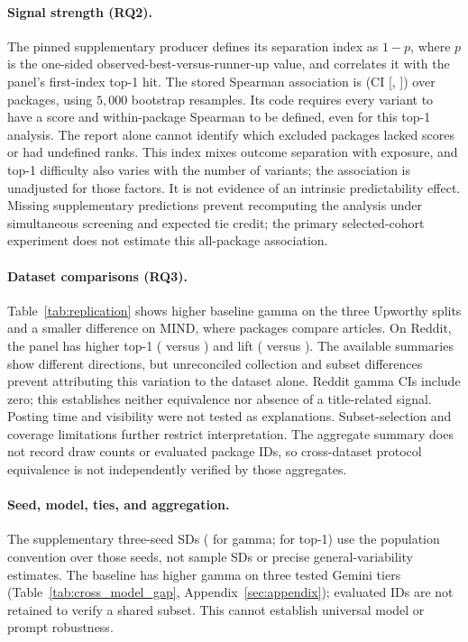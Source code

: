 \paragraph{Signal strength (RQ2).}
The pinned supplementary producer defines its separation index as $1-p$, where $p$ is the
one-sided observed-best-versus-runner-up value, and correlates it with the panel's first-index
top-1 hit. The stored Spearman association is \hThreeTopOne{} (CI
[\hThreeTopOneCILow{}, \hThreeTopOneCIHigh{}]) over \hThreeN{} packages, using $5{,}000$
bootstrap resamples. Its code requires every variant to have a score and within-package
Spearman to be defined, even for this top-1 analysis. The report alone cannot identify which
excluded packages lacked scores or had undefined ranks. This index mixes outcome separation
with exposure, and top-1 difficulty also varies with the number of variants; the association
is unadjusted for those factors. It is not evidence of an intrinsic predictability effect.
Missing supplementary predictions prevent recomputing the analysis under simultaneous screening
and expected tie credit; the primary selected-cohort experiment does not estimate this
all-package association.

\paragraph{Dataset comparisons (RQ3).}
Table~\ref{tab:replication} shows higher baseline gamma on the three Upworthy splits and a smaller
difference on MIND, where packages compare articles. On Reddit, the panel has higher top-1
(\redditPanelTop{} versus \redditBaseTop{}) and lift (\redditPanelLift{} versus \redditBaseLift{}).
The available summaries show different directions, but unreconciled collection and subset
differences prevent attributing this variation to the dataset alone. Reddit gamma
CIs include zero; this establishes neither equivalence nor absence of a title-related signal.
Posting time and visibility were not tested as explanations. Subset-selection and coverage
limitations further restrict interpretation. The aggregate summary does not record draw
counts or evaluated package IDs, so cross-dataset protocol equivalence is not independently
verified by those aggregates.


\paragraph{Seed, model, ties, and aggregation.}
The supplementary three-seed SDs (\stabGammaSD{} for gamma; \stabTopOneSD{} for top-1) use the
population convention over those seeds, not sample SDs or precise general-variability estimates.
The baseline has higher gamma on three tested Gemini tiers (Table~\ref{tab:cross_model_gap},
Appendix~\ref{sec:appendix}); evaluated IDs are not retained to verify a shared subset.
This cannot establish universal model or prompt robustness.

